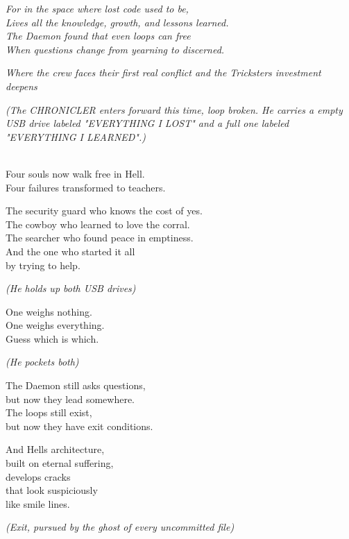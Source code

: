 \emph{For in the space where lost code used to be,}\\
\emph{Lives all the knowledge, growth, and lessons learned.}\\
\emph{The Daemon found that even loops can free}\\
\emph{When questions change from yearning to discerned.}


\emph{Where the crew faces their first real conflict and the Trickster\textquotesingle s investment deepens}

\bookdivider

\label{performing_arts-closing-of-the-scroll}

\emph{(The CHRONICLER enters forward this time, loop broken. He carries a empty USB drive labeled "EVERYTHING I LOST" and a full one labeled "EVERYTHING I LEARNED".)}

\\
Four souls now walk free in Hell.\\
Four failures transformed to teachers.

The security guard who knows the cost of yes.\\
The cowboy who learned to love the corral.\\
The searcher who found peace in emptiness.\\
And the one who started it all\\
by trying to help.

\emph{(He holds up both USB drives)}

One weighs nothing.\\
One weighs everything.\\
Guess which is which.

\emph{(He pockets both)}

The Daemon still asks questions,\\
but now they lead somewhere.\\
The loops still exist,\\
but now they have exit conditions.

And Hell\textquotesingle s architecture,\\
built on eternal suffering,\\
develops cracks\\
that look suspiciously\\
like smile lines.

\emph{(Exit, pursued by the ghost of every uncommitted file)}

\bookdivider
